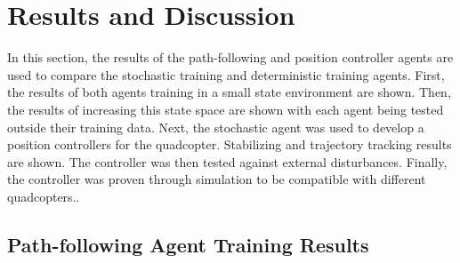 \chapter{Results and Discussion}
In this section, the results of the path-following and position controller agents are used to compare the stochastic training and deterministic training agents. First, the results of both agents training in a small state environment are shown. Then, the results of increasing this state space are shown with each agent being tested outside their training data. Next, the stochastic agent was used to develop a position controllers for the quadcopter. Stabilizing and trajectory tracking results are shown. The controller was then tested against external disturbances. Finally, the controller was proven through simulation to be compatible with different quadcopters..

\section{Path-following Agent Training Results}
